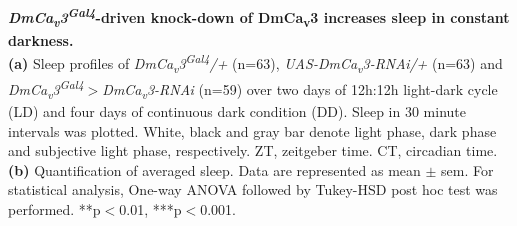 \label{fig:S3}
\textbf{\emph{DmCa\textsubscript{v}3\textsuperscript{Gal4}}-driven knock-down of DmCa\textsubscript{v}3 increases sleep in constant darkness.}
\\
\textbf{(a)} Sleep profiles of \emph{DmCa\textsubscript{v}3\textsuperscript{Gal4}/+} (n=63), \emph{UAS-DmCa\textsubscript{v}3-RNAi/+} (n=63) and \emph{DmCa\textsubscript{v}3\textsuperscript{Gal4}$>$DmCa\textsubscript{v}3-RNAi} (n=59) over two days of 12h:12h light-dark cycle (LD) and four days of continuous dark condition (DD).
Sleep in 30 minute intervals was plotted.
White, black and gray bar denote light phase, dark phase and subjective light phase, respectively.
ZT, zeitgeber time.
CT, circadian time.
\textbf{(b)} Quantification of averaged sleep.
Data are represented as mean $\pm$ sem.
For statistical analysis, One-way ANOVA followed by Tukey-HSD post hoc test was performed.
**p$<$0.01, ***p$<$0.001.
  
  